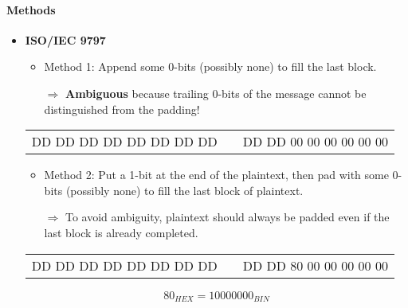 \paragraph{Methods}

\begin{itemize}

    \item \textbf{ISO/IEC 9797}
        \begin{itemize}
            \item Method 1: Append some 0-bits (possibly none) to fill
                the last block.
                
                $\Rightarrow$ \textbf{Ambiguous} because trailing 0-bits
                of the message cannot be distinguished from the padding!
        \end{itemize}
                \begin{center}
                    \begin{tabular}{|c|c|c|}
                        \cline{1-1} \cline{3-3}
                        DD DD DD DD DD DD DD DD & & DD DD
                        \textcolor{red!50!black}{00 00 00 00 00 00} \\
                        \cline{1-1} \cline{3-3}
                    \end{tabular}
                \end{center}
        \begin{itemize}
            \item Method 2: Put a 1-bit at the end of the plaintext, then pad with
                some 0-bits (possibly none) to fill the last block of plaintext. 
                
                $\Rightarrow$ To avoid ambiguity, plaintext should
                always be padded even if the last block is already
                completed.
        \end{itemize}
                \begin{center}
                    \begin{tabular}{|c|c|c|}
                        \cline{1-1} \cline{3-3}
                        DD DD DD DD DD DD DD DD & & DD DD
                        \textcolor{green!50!black}{80}
                        \textcolor{red!50!black}{00 00 00 00 00} \\
                        \cline{1-1} \cline{3-3}
                    \end{tabular}
                \end{center}
                $$80_{HEX} = 10000000_{BIN}$$


\end{itemize}
